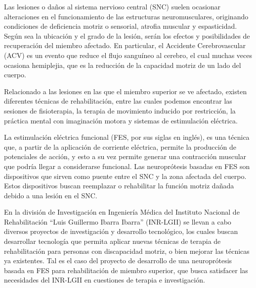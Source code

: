 Las lesiones o daños al sistema nervioso central (SNC) suelen ocasionar alteraciones en el funcionamiento de las estructuras neuromusculares, originando condiciones de deficiencia motriz o sensorial, atrofia muscular y espasticidad. Según sea la ubicación y el grado de la lesión, serán los efectos y posibilidades de recuperación del miembro afectado. En particular, el Accidente Cerebrovascular (ACV) es un evento que reduce el flujo sanguíneo al cerebro, el cual muchas veces ocasiona hemiplejia, que es la reducción de la capacidad motriz de un lado del cuerpo.



Relacionado a las lesiones en las que el miembro superior se ve afectado, existen diferentes técnicas de rehabilitación, entre las cuales podemos encontrar las sesiones de fisioterapia, la terapia de movimiento inducido por restricción, la práctica mental con imaginación motora y sistemas de estimulación eléctrica.

La estimulación eléctrica funcional (FES, por sus siglas en inglés), es una técnica que, a partir de la aplicación de corriente eléctrica, permite la producción de potenciales de acción, y esto a su vez permite generar una contracción muscular que podría llegar a considerarse funcional\cite{Peckham2005}. Las neuroprótesis basadas en FES son dispositivos que sirven como puente entre el SNC y la zona afectada del cuerpo. Estos dispositivos buscan reemplazar o rehabilitar la función motriz dañada debido a una lesión en el SNC.

En la división de Investigación en Ingeniería Médica del Instituto Nacional de Rehabilitación ``Luis Guillermo Ibarra Ibarra'' (INR-LGII) se llevan a cabo diversos proyectos de investigación y desarrollo tecnológico, los cuales buscan desarrollar tecnología que permita aplicar nuevas técnicas de terapia de rehabilitación para personas con discapacidad motriz, o bien mejorar las técnicas ya existentes. Tal es el caso del proyecto de desarrollo de una neuroprótesis basada en FES para rehabilitación de miembro superior, que busca satisfacer las necesidades del INR-LGII en cuestiones de terapia e investigación.

